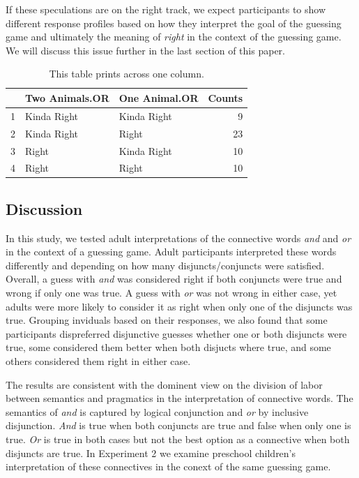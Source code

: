 \documentclass[10pt, letterpaper]{article}
\begin{document}
If these speculations are on the right track, we expect participants to
show different response profiles based on how they interpret the goal of
the guessing game and ultimately the meaning of \emph{right} in the
context of the guessing game. We will discuss this issue further in the
last section of this paper.

\begin{table}[t]
\centering
\begin{tabular}{rllr}
  \hline
 & Two Animals.OR & One Animal.OR & Counts \\ 
  \hline
1 & Kinda Right & Kinda Right &   9 \\ 
  2 & Kinda Right & Right &  23 \\ 
  3 & Right & Kinda Right &  10 \\ 
  4 & Right & Right &  10 \\ 
   \hline
\end{tabular}
\caption{This table prints across one column.} 
\end{table}

\subsection{Discussion}\label{discussion}

In this study, we tested adult interpretations of the connective words
\emph{and} and \emph{or} in the context of a guessing game. Adult
participants interpreted these words differently and depending on how
many disjuncts/conjuncts were satisfied. Overall, a guess with
\emph{and} was considered right if both conjuncts were true and wrong if
only one was true. A guess with \emph{or} was not wrong in either case,
yet adults were more likely to consider it as right when only one of the
disjuncts was true. Grouping inviduals based on their responses, we also
found that some participants dispreferred disjunctive guesses whether
one or both disjuncts were true, some considered them better when both
disjucts where true, and some others considered them right in either
case.

The results are consistent with the dominent view on the division of
labor between semantics and pragmatics in the interpretation of
connective words. The semantics of \emph{and} is captured by logical
conjunction and \emph{or} by inclusive disjunction. \emph{And} is true
when both conjuncts are true and false when only one is true. \emph{Or}
is true in both cases but not the best option as a connective when both
disjuncts are true. In Experiment 2 we examine preschool children's
interpretation of these connectives in the conext of the same guessing
game.
\end{document}

